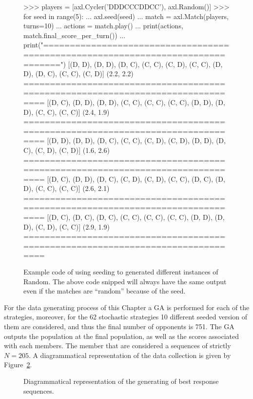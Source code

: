 \begin{figure}[!htbp]
    \begin{usagepy}
>>> players = [axl.Cycler('DDDCCCDDCC'), axl.Random()]
>>> for seed in range(5):
...   axl.seed(seed)
...   match = axl.Match(players, turns=10)
...   actions = match.play()
...   print(actions, match.final_score_per_turn())
...   print("================================================================================")
[(D, D), (D, D), (D, C), (C, C), (C, D), (C, C), (D, D), (D, C), (C, C), (C, D)] (2.2, 2.2)
================================================================================
[(D, C), (D, D), (D, D), (C, C), (C, C), (C, C), (D, D), (D, D), (C, C), (C, C)] (2.4, 1.9)
================================================================================
[(D, D), (D, D), (D, C), (C, C), (C, D), (C, D), (D, D), (D, C), (C, D), (C, D)] (1.6, 2.6)
================================================================================
[(D, C), (D, D), (D, C), (C, D), (C, D), (C, C), (D, C), (D, D), (C, C), (C, C)] (2.6, 2.1)
================================================================================
[(D, C), (D, C), (D, C), (C, C), (C, C), (C, C), (D, D), (D, D), (C, D), (C, C)] (2.9, 1.9)
================================================================================
    \end{usagepy}
\caption{Example code of using seeding to generated different instances of Random.
The above code snipped will always have the same output even if the matches are
``random'' because of the seed.}\label{fig:random_apl_example}
\end{figure}

For the data generating process of this Chapter a GA is performed for each of
the \numberofstrategiesbestsequences strategies, moreover, for the 62 stochastic
strategies 10 different seeded version of them are considered, and thus the
final number of opponents is 751. The GA outputs the population at the final
population, as well as the scores associated with each members. The member that
are considered a sequences of strictly \(N=205\). A diagrammatical
representation of the data collection is given by
Figure~\ref{fig:data_generating_process_diagram}.

\begin{figure}[!htbp]
    \centering
    
    \caption{Diagrammatical representation of the generating of best response
    sequences.}\label{fig:data_generating_process_diagram}
\end{figure}

